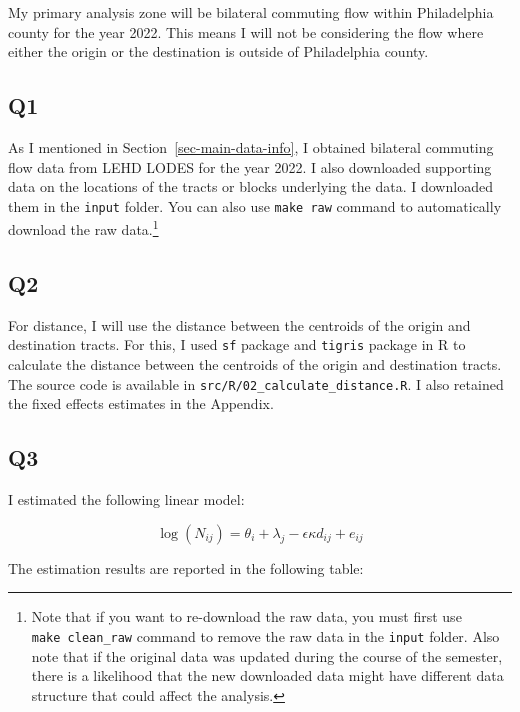 \documentclass[
  11pt]{article}
\begin{document}
My primary analysis zone will be bilateral commuting flow within
Philadelphia county for the year 2022. This means I will not be
considering the flow where either the origin or the destination is
outside of Philadelphia county.

\subsection*{Q1}\label{q1}

As I mentioned in Section~\ref{sec-main-data-info}, I obtained bilateral
commuting flow data from LEHD LODES for the year 2022. I also downloaded
supporting data on the locations of the tracts or blocks underlying the
data. I downloaded them in the \texttt{input} folder. You can also use
\texttt{make\ raw} command to automatically download the raw
data.\footnote{Note that if you want to re-download the raw data, you
  must first use \texttt{make\ clean\_raw} command to remove the raw
  data in the \texttt{input} folder. Also note that if the original data
  was updated during the course of the semester, there is a likelihood
  that the new downloaded data might have different data structure that
  could affect the analysis.}

\subsection*{Q2}\label{q2}

For distance, I will use the distance between the centroids of the
origin and destination tracts. For this, I used \texttt{sf} package and
\texttt{tigris} package in R to calculate the distance between the
centroids of the origin and destination tracts. The source code is
available in \texttt{src/R/02\_calculate\_distance.R}. I also retained
the fixed effects estimates in the Appendix.

\subsection*{Q3}\label{q3}

I estimated the following linear model:

\[
\log(N_{ij}) = \theta_{i} + \lambda_{j} - \epsilon \kappa d_{ij} + e_{ij}\label{eq:distance}
\]

The estimation results are reported in the following table:

\clearpage
\end{document}
